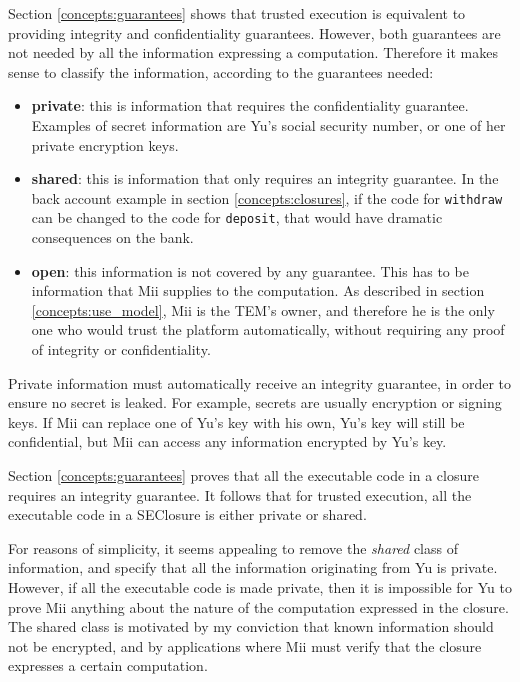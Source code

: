 Section \ref{concepts:guarantees} shows that trusted execution is equivalent
to providing integrity and confidentiality guarantees. However, both guarantees
are not needed by all the information expressing a computation. Therefore it
makes sense to classify the information, according to the guarantees needed:
\begin {itemize}
  \item \textbf{private}: this is information that requires the confidentiality
  guarantee. Examples of secret information are Yu's social security number, or
  one of her private encryption keys.
  \item \textbf{shared}: this is information that only requires an integrity
  guarantee. In the back account example in section \ref{concepts:closures}, if 
  the code for \texttt{withdraw} can be changed to the code for
  \texttt{deposit}, that would have dramatic consequences on the bank.
  \item \textbf{open}: this information is not covered by any guarantee. This
  has to be information that Mii supplies to the computation. As described in section
  \ref{concepts:use_model}, Mii is the TEM's owner, and therefore he is the only
  one who would trust the platform automatically, without requiring any proof
  of integrity or confidentiality.
\end{itemize}

Private information must automatically receive an integrity guarantee, in order
to ensure no secret is leaked. For example, secrets are usually encryption or
signing keys. If Mii can replace one of Yu's key with his own, Yu's key will
still be confidential, but Mii can access any information encrypted by Yu's key.

Section \ref{concepts:guarantees} proves that all the executable code in a
closure requires an integrity guarantee. It follows that for trusted execution,
all the executable code in a SEClosure is either private or shared.

For reasons of simplicity, it seems appealing to remove the \textit{shared}
class of information, and specify that all the information originating from Yu
is private. However, if all the executable code is made private, then it is
impossible for Yu to prove Mii anything about the nature of the computation
expressed in the closure. The shared class is motivated by my conviction that
known information should not be encrypted, and by applications where Mii must
verify that the closure expresses a certain computation.

